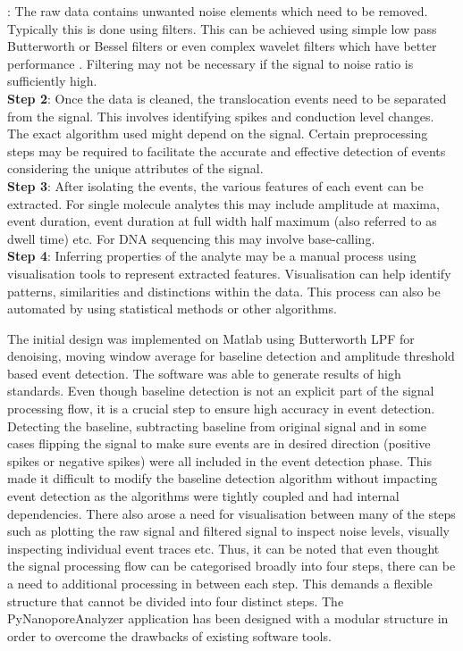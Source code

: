\documentclass[journal]{IEEEtran}
\begin{document}
: The raw data contains unwanted noise elements which need to be removed. Typically this is done using filters. This can be achieved using simple low pass Butterworth or Bessel filters or even complex wavelet filters which have better performance \cite{shekarWaveletDenoisingHighBandwidth2019}. Filtering may not be necessary if the signal to noise ratio is sufficiently high. \\
{\bf{Step 2}}: Once the data is cleaned, the translocation events need to be separated from the signal. This involves identifying spikes and conduction level changes. The exact algorithm used might depend on the signal. Certain preprocessing steps may be required to facilitate the accurate and effective detection of events considering the unique attributes of the signal. \\
{\bf{Step 3}}: After isolating the events, the various features of each event can be extracted. For single molecule analytes this may include amplitude at maxima, event duration, event duration at full width half maximum (also referred to as dwell time) etc. For DNA sequencing this may involve base-calling. \\
{\bf{Step 4}}: Inferring properties of the analyte may be a manual process using visualisation tools to represent extracted features. Visualisation can help identify patterns, similarities and distinctions within the data. This process can also be automated by using statistical methods or other algorithms.

The initial design was implemented on Matlab using Butterworth LPF for denoising, moving window average for baseline detection and amplitude threshold based event detection. The software was able to generate results of high standards. Even though baseline detection is not an explicit part of the signal processing flow, it is a crucial step to ensure high accuracy in event detection. Detecting the baseline, subtracting baseline from original signal and in some cases flipping the signal to make sure events are in desired direction (positive spikes or negative spikes) were all included in the event detection phase. This made it difficult to modify the baseline detection algorithm without impacting event detection as the algorithms were tightly coupled and had internal dependencies. There also arose a need for visualisation between many of the steps such as plotting the raw signal and filtered signal to inspect noise levels, visually inspecting individual event traces etc. Thus, it can be noted that even thought the signal processing flow can be categorised broadly into four steps, there can be a need to additional processing in between each step. This demands a flexible structure that cannot be divided into four distinct steps. The PyNanoporeAnalyzer application has been designed with a modular structure in order to overcome the drawbacks of existing software tools.
\end{document}
